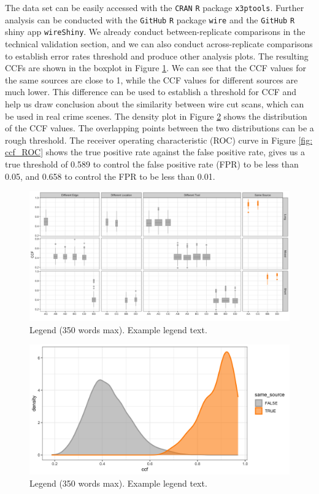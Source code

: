 \documentclass[fleqn,10pt]{wlscirep}
\begin{document}
The data set can be easily accessed with the \texttt{CRAN} \texttt{R}
package \texttt{x3ptools}. Further analysis can be conducted with the
\texttt{GitHub} \texttt{R} package \texttt{wire} and the \texttt{GitHub}
\texttt{R} shiny app \texttt{wireShiny}. We already conduct
between-replicate comparisons in the technical validation section, and
we can also conduct across-replicate comparisons to establish error
rates threshold and produce other analysis plots. The resulting CCFs are
shown in the boxplot in Figure \ref{fig: ccf_boxplot}. We can see that
the CCF values for the same sources are close to 1, while the CCF values
for different sources are much lower. This difference can be used to
establish a threshold for CCF and help us draw conclusion about the
similarity between wire cut scans, which can be used in real crime
scenes. The density plot in Figure \ref{fig: ccf_density} shows the
distribution of the CCF values. The overlapping points between the two
distributions can be a rough threshold. The receiver operating
characteristic (ROC) curve in Figure \ref{fig: ccf_ROC} shows the true
positive rate against the false positive rate, gives us a true threshold
of 0.589 to control the false positive rate (FPR) to be less than 0.05,
and 0.658 to control the FPR to be less than 0.01.

\begin{figure}[ht]
\centering
\includegraphics[width=0.8\linewidth]{ccf_boxplot.png}
\caption{Legend (350 words max). Example legend text.}
\label{fig: ccf_boxplot}
\end{figure}

\begin{figure}[ht]
\centering
\includegraphics[width=0.8\linewidth]{ccf_density.png}
\caption{Legend (350 words max). Example legend text.}
\label{fig: ccf_density}
\end{figure}
\end{document}
